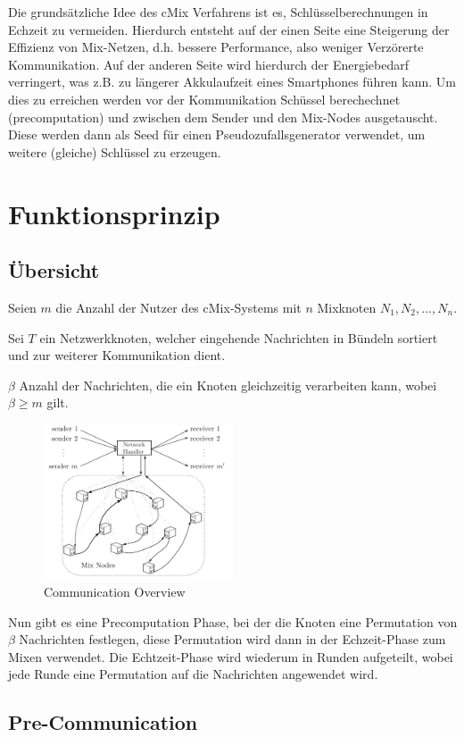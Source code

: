 \documentclass[
    fontsize=12pt,
    headings=small,
    parskip=half,           %
    bibliography=totoc,
    numbers=noenddot,       %
    open=any,               %
    ]{scrreprt}
\begin{document}
Die grundsätzliche Idee des cMix Verfahrens ist es, Schlüsselberechnungen in Echzeit zu vermeiden. Hierdurch entsteht auf 
der einen Seite eine Steigerung der Effizienz von Mix-Netzen, d.h. bessere Performance, also weniger Verzörerte Kommunikation. Auf der anderen Seite wird hierdurch
 der Energiebedarf verringert, was z.B. zu längerer Akkulaufzeit eines Smartphones führen kann.
 Um dies zu erreichen werden vor der Kommunikation Schüssel berechechnet (precomputation) und zwischen dem Sender und den Mix-Nodes ausgetauscht.
 Diese werden dann als Seed für einen Pseudozufallsgenerator verwendet, um weitere (gleiche) Schlüssel zu erzeugen.

\section{Funktionsprinzip}
\subsection{Übersicht}
Seien $m$ die Anzahl der Nutzer des cMix-Systems mit $n$ Mixknoten $N_1, N_2, ... ,  N_n$. 

Sei $T$ ein Netzwerkknoten, welcher eingehende Nachrichten in Bündeln sortiert und zur weiterer Kommunikation dient.

$\beta$ Anzahl der Nachrichten, die ein Knoten gleichzeitig verarbeiten kann, wobei $\beta \geq m$ gilt.
\begin{figure}[h]
 \caption{Communication Overview}
\includegraphics[width=0.5\textwidth]{Bilder/commu_model.png}
\end{figure}


Nun gibt es eine Precomputation Phase, bei der die Knoten eine Permutation von $\beta$ Nachrichten festlegen, diese Permutation wird dann in der Echzeit-Phase zum Mixen verwendet.
Die Echtzeit-Phase wird wiederum in Runden aufgeteilt, wobei jede Runde eine Permutation auf die Nachrichten angewendet wird.


\subsection{Pre-Communication}
\end{document}
